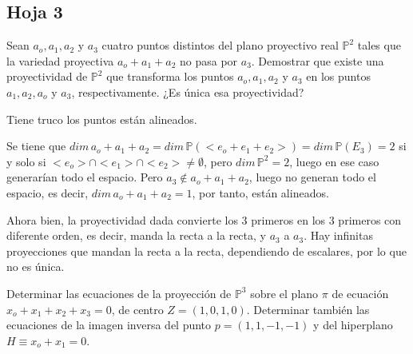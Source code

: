 \subsection{Hoja 3}
\begin{ejer}
    [6] Sean $a_o, a_1, a_2$ y $a_3$ cuatro puntos distintos del plano  proyectivo real $\mathbb P^2$ tales que la variedad proyectiva $a_o + a_1 + a_2$ no pasa por $a_3$. Demostrar que existe una proyectividad de $\mathbb P^2$ que transforma los puntos $a_o, a_1, a_2$ y $a_3$ en los puntos $a_1, a_2, a_o$ y $a_3$, respectivamente. ¿Es \'unica esa proyectividad?
\end{ejer}
\begin{sol}Tiene truco los puntos están alineados.

Se tiene que $dim \, a_o+a_1+a_2=dim \, \mathbb P(<e_o+e_1+e_2>) =dim \, \mathbb P(E_3)= 2$ si y solo si $<e_o> \cap <e_1> \cap <e_2> \neq \emptyset$, pero $dim\, \mathbb P^2 =2$, luego en ese caso generar\'ian todo el espacio. Pero $a_3\nin a_o+a_1+a_2$, luego no generan todo el espacio, es decir, $dim \, a_o+a_1+a_2 = 1$, por tanto, est\'an alineados.  

Ahora bien, la proyectividad dada convierte los 3 primeros en los 3 primeros con diferente orden, es decir, manda la recta a la recta, y $a_3$ a $a_3$. Hay infinitas proyecciones que mandan la recta a la recta, dependiendo de escalares, por lo que no es \'unica.
\end{sol}
\begin{ejer}
    [11] Determinar las ecuaciones de la proyecci\'on de $\mathbb P^3$ sobre el plano $\pi$ de ecuaci\'on $x_o + x_1 + x_2 + x_3 = 0$, de centro $Z = (1, 0, 1, 0)$. Determinar tambi\'en las ecuaciones de la imagen inversa del punto $p =(1, 1, -1, -1)$ y del hiperplano $H \equiv x_o + x_1 = 0$. 
\end{ejer}
